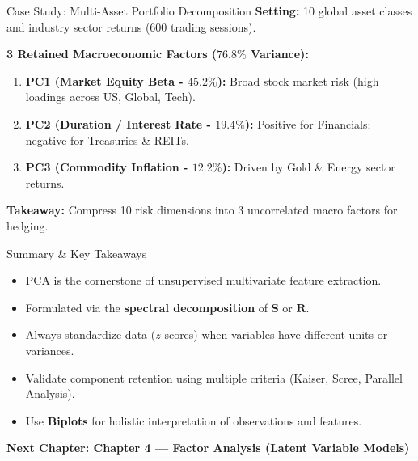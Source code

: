 \documentclass[aspectratio=169,ignorenonframetext]{beamer}
\begin{document}
\begin{frame}{Case Study: Multi-Asset Portfolio Decomposition}
\textbf{Setting:} 10 global asset classes and industry sector returns
(600 trading sessions).

\textbf{3 Retained Macroeconomic Factors (\(76.8\%\) Variance):}

\begin{enumerate}
\item
  \textbf{PC1 (Market Equity Beta - \(45.2\%\)):} Broad stock market
  risk (high loadings across US, Global, Tech).
\item
  \textbf{PC2 (Duration / Interest Rate - \(19.4\%\)):} Positive for
  Financials; negative for Treasuries \& REITs.
\item
  \textbf{PC3 (Commodity Inflation - \(12.2\%\)):} Driven by Gold \&
  Energy sector returns.
\end{enumerate}

\textbf{Takeaway:} Compress 10 risk dimensions into 3 uncorrelated macro
factors for hedging.
\end{frame}

\begin{frame}{Summary \& Key Takeaways}
\begin{itemize}
\item
  PCA is the cornerstone of unsupervised multivariate feature
  extraction.
\item
  Formulated via the \textbf{spectral decomposition} of \(\mathbf{S}\)
  or \(\mathbf{R}\).
\item
  Always standardize data (\(z\)-scores) when variables have different
  units or variances.
\item
  Validate component retention using multiple criteria (Kaiser, Scree,
  Parallel Analysis).
\item
  Use \textbf{Biplots} for holistic interpretation of observations and
  features.
\end{itemize}

{ \textbf{Next Chapter: Chapter 4 --- Factor Analysis (Latent Variable
Models)} }
\end{frame}
\end{document}
